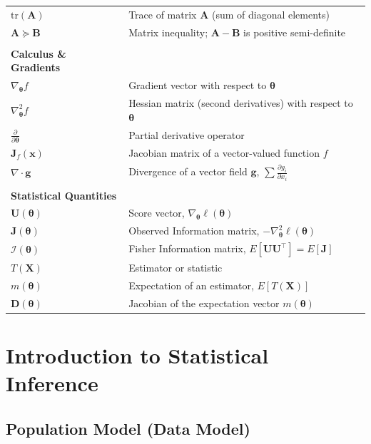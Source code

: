 \documentclass[
  letterpaper,
  DIV=11,
  numbers=noendperiod]{scrreprt}
\renewcommand{\[}{\begin{equation}}
\renewcommand{\]}{\end{equation}}
\theoremstyle{definition}
\theoremstyle{plain}
\theoremstyle{plain}
\theoremstyle{plain}
\theoremstyle{definition}
\theoremstyle{plain}
\theoremstyle{remark}
\begin{document}
\begin{longtable}[]{@{}
  >{\raggedright\arraybackslash}p{}
  >{\raggedright\arraybackslash}p{}@{}}
\(\text{tr}(\mathbf{A})\) & Trace of matrix \(\mathbf{A}\) (sum of
diagonal elements) \\
\(\mathbf{A} \succeq \mathbf{B}\) & Matrix inequality;
\(\mathbf{A} - \mathbf{B}\) is positive semi-definite \\
& \\
\textbf{Calculus \& Gradients} & \\
\(\nabla_{\boldsymbol{\theta}} f\) & Gradient vector with respect to
\(\boldsymbol{\theta}\) \\
\(\nabla^2_{\boldsymbol{\theta}} f\) & Hessian matrix (second
derivatives) with respect to \(\boldsymbol{\theta}\) \\
\(\frac{\partial}{\partial \boldsymbol{\theta}}\) & Partial derivative
operator \\
\(\mathbf{J}_f(\mathbf{x})\) & Jacobian matrix of a vector-valued
function \(f\) \\
\(\nabla \cdot \mathbf{g}\) & Divergence of a vector field
\(\mathbf{g}\), \(\sum \frac{\partial g_i}{\partial x_i}\) \\
& \\
\textbf{Statistical Quantities} & \\
\(\mathbf{U}(\boldsymbol{\theta})\) & Score vector,
\(\nabla_{\boldsymbol{\theta}} \ell(\boldsymbol{\theta})\) \\
\(\mathbf{J}(\boldsymbol{\theta})\) & Observed Information matrix,
\(-\nabla^2_{\boldsymbol{\theta}} \ell(\boldsymbol{\theta})\) \\
\(\mathcal{I}(\boldsymbol{\theta})\) & Fisher Information matrix,
\(E[\mathbf{U}\mathbf{U}^\top] = E[\mathbf{J}]\) \\
\(T(\mathbf{X})\) & Estimator or statistic \\
\(m(\boldsymbol{\theta})\) & Expectation of an estimator,
\(E[T(\mathbf{X})]\) \\
\(\mathbf{D}(\boldsymbol{\theta})\) & Jacobian of the expectation vector
\(m(\boldsymbol{\theta})\) \\
\end{longtable}


\chapter{Introduction to Statistical
Inference}\label{introduction-to-statistical-inference}

\section{Population Model (Data
Model)}\label{population-model-data-model}
\end{document}
